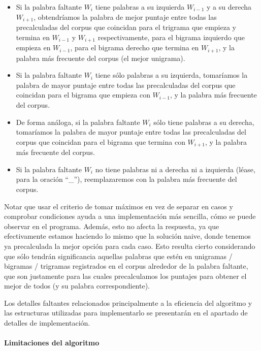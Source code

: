 \documentclass[a4paper]{article}
\begin{document}
\begin{enumerate}
        \begin{itemize}
            \item Si la palabra faltante $W_i$ tiene palabras a su izquierda $W_{i-1}$ y a su derecha $W_{i+1}$, obtendríamos la palabra de mejor puntaje entre todas las precalculadas del corpus que coincidan para el trigrama que empieza y termina en $W_{i-1}$ y $W_{i+1}$ respectivamente, para el bigrama izquierdo que empieza en $W_{i-1}$, para el bigrama derecho que termina en $W_{i+1}$, y la palabra más frecuente del corpus (el mejor unigrama).
            \item Si la palabra faltante $W_i$ tiene sólo palabras a su izquierda, tomaríamos la palabra de mayor puntaje entre todas las precalculadas del corpus que coincidan para el bigrama que empieza  con $W_{i-1}$, y la palabra más frecuente del corpus.
            \item De forma análoga, si la palabra faltante $W_i$ sólo tiene palabras a su derecha, tomaríamos la palabra de mayor puntaje entre todas las precalculadas del corpus que coincidan para el bigrama que termina con $W_{i+1}$, y la palabra más frecuente del corpus.
            \item Si la palabra faltante $W_i$ no tiene palabras ni a derecha ni a izquierda (léase, para la oración ``\_''), reemplazaremos con la palabra más frecuente del corpus.
        \end{itemize}

        Notar que usar el criterio de tomar máximos en vez de separar en casos y comprobar condiciones ayuda a una implementación más sencilla, cómo se puede observar en el programa. Además, esto no afecta la respuesta, ya que efectivamente estamos haciendo lo mismo que la solución naive, donde tenemos ya precalculada la mejor opción para cada caso. Esto resulta cierto considerando que sólo tendrán significancia aquellas palabras que estén en unigramas / bigramas / trigramas registrados en el corpus alrededor de la palabra faltante, que son justamente para las cuales precalculamos los puntajes para obtener el mejor de todos (y su palabra correspondiente).
\end{enumerate}

Los detalles faltantes relacionados principalmente a la eficiencia del algoritmo y las estructuras utilizadas para implementarlo se presentarán en el apartado de detalles de implementación.

\paragraph{Limitaciones del algoritmo}
\end{document}
